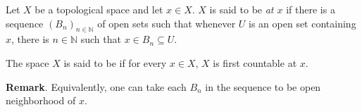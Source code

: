 \documentclass[12pt]{article}
\begin{document}
Let $X$ be a topological space and let $x\in X$.  $X$ is said to be \emph{ at $x$} if there is a sequence $(B_n)_{n\in\mathbb{N}}$ of open sets such that whenever $U$ is an open set containing $x$, there is $n\in\mathbb{N}$ such that $x\in B_n\subseteq U$.

The space $X$ is said to be \emph{} if for every $x\in X$, $X$ is first countable at $x$.

\textbf{Remark}.  Equivalently, one can take each $B_n$ in the sequence to be open neighborhood of $x$.
\end{document}
